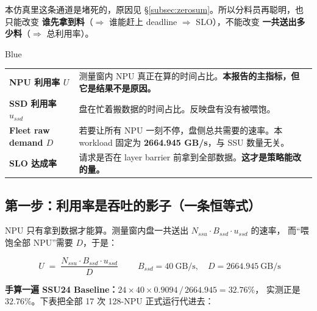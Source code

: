 \documentclass[UTF8,fontset=none,10pt,a4paper]{ctexart}
\begin{document}
本仿真里这条通道是堵死的，原因见 \S\ref{subsec:zerosum}。所以分料员再聪明，也只能改变
\textbf{谁先拿到料}（$\Rightarrow$ 谁能赶上 deadline $\Rightarrow$ SLO），不能改变
\textbf{一共送出多少料}（$\Rightarrow$ 总利用率）。

\begin{insightbox}[title={术语速查：四个名字很像、含义完全不同的量}]{Blue}
\begin{tabularx}{\linewidth}{>{\bfseries\sffamily}p{34mm} Y}
\toprule
NPU 利用率 $U$ & 测量窗内 NPU 真正在算的时间占比。\textbf{本报告的主指标，但它是结果不是原因。}\\
SSD 利用率 $u_{ssd}$ & 盘在忙着搬数据的时间占比。反映盘有没有被喂饱。\\
Fleet raw demand $D$ & 若要让所有 NPU 一刻不停，盘侧总共需要的速率。本 workload 固定为
\textbf{2664.945 GB/s}，与 SSU 数量无关。\\
SLO 达成率 & 请求是否在 layer barrier 前拿到全部数据。\textbf{这才是策略能改的量。}\\
\bottomrule
\end{tabularx}
\end{insightbox}

\subsection{第一步：利用率是吞吐的影子（一条恒等式）}

NPU 只有拿到数据才能算。测量窗内盘一共送出 $N_{ssu}\cdot B_{ssd}\cdot u_{ssd}$ 的速率，
而“喂饱全部 NPU”需要 $D$，于是：

\begin{equation}
  \boxed{\;U \;=\; \frac{N_{ssu}\cdot B_{ssd}\cdot u_{ssd}}{D}\;}
  \qquad B_{ssd}=40\ \mathrm{GB/s},\quad D=2664.945\ \mathrm{GB/s}
  \label{eq:util-identity}
\end{equation}

\textbf{手算一遍 SSU24 Baseline：}$24\times 40\times 0.9094 \,/\, 2664.945 = 32.76\%$，
实测正是 $32.76\%$。下表把全部 17 次 128-NPU 正式运行代进去：
\end{document}

